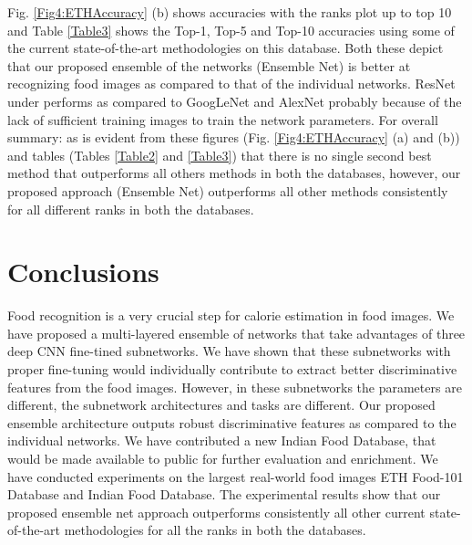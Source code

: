 \documentclass[journal]{IEEEtran}%
\begin{document}
Fig. \ref{Fig4:ETHAccuracy} (b) shows accuracies with the ranks plot up to top 10 and Table \ref{Table3} shows the Top-1, Top-5 and Top-10 accuracies using some of the current state-of-the-art methodologies on this database. Both these depict that our proposed ensemble of the networks (Ensemble Net) is better at recognizing food images as compared to that of the individual networks. ResNet under performs as compared to GoogLeNet and AlexNet probably because of the lack of sufficient training images to train the network parameters. For overall summary: as is evident from these figures (Fig. \ref{Fig4:ETHAccuracy} (a) and (b)) and tables (Tables \ref{Table2} and \ref{Table3}) that there is no single second best method that outperforms all others methods in both the databases, however, our proposed approach (Ensemble Net) outperforms all other methods consistently for all different ranks in both the databases.



\section{Conclusions}
Food recognition is a very crucial step for calorie estimation in food images. We have proposed a multi-layered ensemble of networks that take advantages of three deep CNN fine-tined subnetworks. We have shown that these subnetworks with proper fine-tuning would individually contribute to extract better discriminative features from the food images. However, in these subnetworks the parameters are different, the subnetwork architectures and tasks are different. Our proposed ensemble architecture outputs robust discriminative features as compared to the individual networks. We have contributed a new Indian Food Database, that would be made available to public for further evaluation and enrichment. We have conducted experiments on the largest real-world food images ETH Food-101 Database and Indian Food Database. The experimental results show that our proposed ensemble net approach outperforms consistently all other current state-of-the-art methodologies for all the ranks in both the databases.




\ifCLASSOPTIONcaptionsoff
  \newpage
\fi



\end{document}
